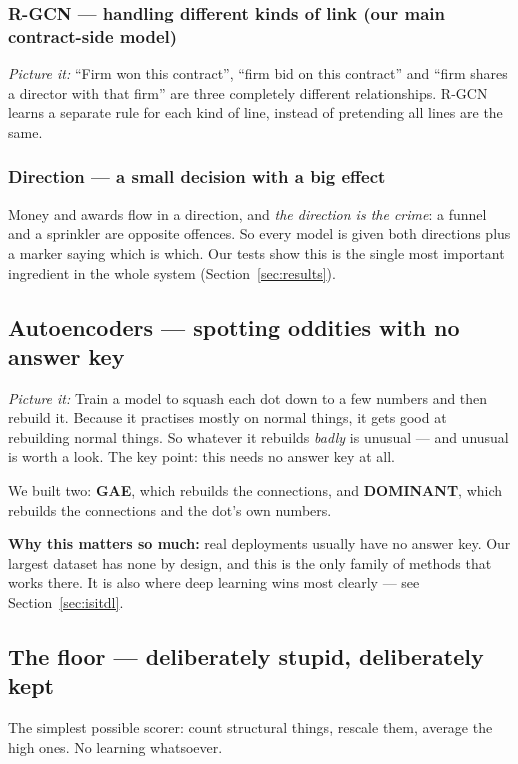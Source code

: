 \documentclass[11pt,a4paper]{article}
\newcommand{\pw}[1]{\textit{\textcolor{accent}{Picture it:}} #1}
\begin{document}
\subsubsection*{R-GCN --- handling different kinds of link (our main contract-side model)}

\pw{``Firm won this contract'', ``firm bid on this contract'' and ``firm shares a
director with that firm'' are three completely different relationships. R-GCN
learns a separate rule for each kind of line, instead of pretending all lines are
the same.}

\subsubsection*{Direction --- a small decision with a big effect}

Money and awards flow in a direction, and \emph{the direction is the crime}: a
funnel and a sprinkler are opposite offences. So every model is given both
directions plus a marker saying which is which. Our tests show this is the single
most important ingredient in the whole system (Section~\ref{sec:results}).

\subsection{Autoencoders --- spotting oddities with no answer key}

\pw{Train a model to squash each dot down to a few numbers and then rebuild it.
Because it practises mostly on normal things, it gets good at rebuilding normal
things. So whatever it rebuilds \emph{badly} is unusual --- and unusual is worth a
look. The key point: this needs no answer key at all.}

We built two: \textbf{GAE}, which rebuilds the connections, and
\textbf{DOMINANT}, which rebuilds the connections and the dot's own numbers.

\textbf{Why this matters so much:} real deployments usually have no answer key.
Our largest dataset has none by design, and this is the only family of methods
that works there. It is also where deep learning wins most clearly --- see
Section~\ref{sec:isitdl}.

\subsection{The floor --- deliberately stupid, deliberately kept}

The simplest possible scorer: count structural things, rescale them, average the
high ones. No learning whatsoever.
\end{document}
